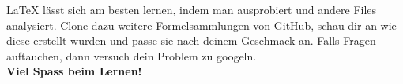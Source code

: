 	\begin{aufgabe}[Ausprobieren!]
		\LaTeX{} lässt sich am besten lernen, indem man ausprobiert und andere Files analysiert. Clone dazu weitere Formelsammlungen von {\color{blue}\href{https://github.com/HSR-Stud/VorlageZFLaTex}{GitHub}}, schau dir an wie diese erstellt wurden und passe sie nach deinem Geschmack an. Falls Fragen auftauchen, dann versuch dein Problem zu googeln.\vspace{6pt}\\
		\textbf{\large Viel Spass beim Lernen! %
		}
	\end{aufgabe}